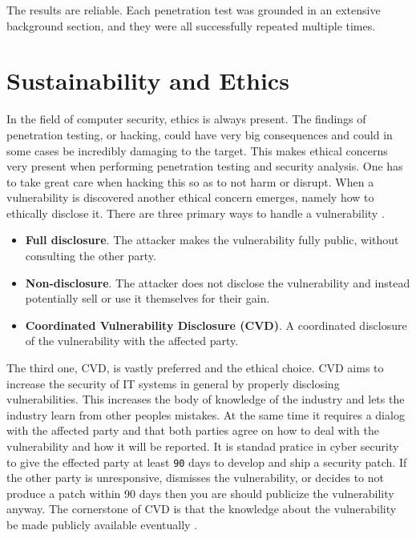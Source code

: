 The results are reliable. Each penetration test was grounded in an extensive background section, and they were all successfully repeated multiple times.

\section{Sustainability and Ethics}
In the field of computer security, ethics is always present. The findings of penetration testing, or hacking, could have very big consequences and could in some cases be incredibly damaging to the target. This makes ethical concerns very present when performing penetration testing and security analysis. One has to take great care when hacking this so as to not harm or disrupt. When a vulnerability is discovered another ethical concern emerges, namely how to ethically disclose it. There are three primary ways to handle a vulnerability  \cite{disclosure-guideline}.
\begin{itemize}
    \item \textbf{Full disclosure}. The attacker makes the vulnerability fully public, without consulting the other party.
    \item \textbf{Non-disclosure}. The attacker does not disclose the vulnerability and instead potentially sell or use it themselves for their gain.
    \item \textbf{Coordinated Vulnerability Disclosure (CVD)}. A coordinated disclosure of the vulnerability with the affected party.
\end{itemize}
The third one, CVD, is vastly preferred and the ethical choice. CVD aims to increase the security of IT systems in general by properly disclosing vulnerabilities. This increases the body of knowledge of the industry and lets the industry learn from other peoples mistakes. At the same time it requires a dialog with the affected party and that both parties agree on how to deal with the vulnerability and how it will be reported. It is standad pratice in cyber security to give the effected party at least \texttt{90} days to develop and ship a security patch. If the other party is unresponsive, dismisses the vulnerability, or decides to not produce a patch within 90 days then you are should publicize the vulnerability anyway. The cornerstone of CVD is that the knowledge about the vulnerability be made publicly available eventually \cite{disclosure-guideline}.

